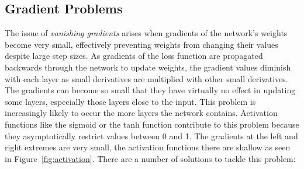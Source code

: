 \FloatBarrier
\subsection{Gradient Problems}

The issue of \emph{vanishing gradients} arises when gradients of the network's weights become very small, effectively preventing weights from changing their values despite large step sizes. As gradients of the loss function are propagated backwards through the network to update weights, the gradient values diminish with each layer as small derivatives are multiplied with  other small derivatives. The gradients can become so small that they have virtually no effect in updating some layers, especially those layers close to the input. This problem is increasingly likely to occur the more layers the network contains. Activation functions like the sigmoid or the tanh function contribute to this problem because they asymptotically restrict values between 0 and 1. The gradients at the left and right extremes are very small, the activation functions there are shallow as seen in Figure~\ref{fig:activation}. There are a number of solutions to tackle this problem:

